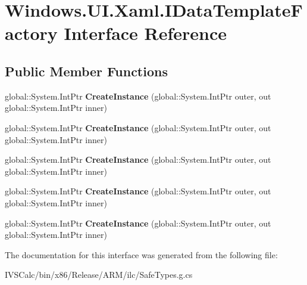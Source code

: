 \hypertarget{interface_windows_1_1_u_i_1_1_xaml_1_1_i_data_template_factory}{}\section{Windows.\+U\+I.\+Xaml.\+I\+Data\+Template\+Factory Interface Reference}
\label{interface_windows_1_1_u_i_1_1_xaml_1_1_i_data_template_factory}
\subsection*{Public Member Functions}
\begin{DoxyCompactItemize}
\item 
\mbox{\label{interface_windows_1_1_u_i_1_1_xaml_1_1_i_data_template_factory_ab292c89a22a8791585ca4182324d8a37}} 
global\+::\+System.\+Int\+Ptr {\bfseries Create\+Instance} (global\+::\+System.\+Int\+Ptr outer, out global\+::\+System.\+Int\+Ptr inner)
\item 
\mbox{\label{interface_windows_1_1_u_i_1_1_xaml_1_1_i_data_template_factory_ab292c89a22a8791585ca4182324d8a37}} 
global\+::\+System.\+Int\+Ptr {\bfseries Create\+Instance} (global\+::\+System.\+Int\+Ptr outer, out global\+::\+System.\+Int\+Ptr inner)
\item 
\mbox{\label{interface_windows_1_1_u_i_1_1_xaml_1_1_i_data_template_factory_ab292c89a22a8791585ca4182324d8a37}} 
global\+::\+System.\+Int\+Ptr {\bfseries Create\+Instance} (global\+::\+System.\+Int\+Ptr outer, out global\+::\+System.\+Int\+Ptr inner)
\item 
\mbox{\label{interface_windows_1_1_u_i_1_1_xaml_1_1_i_data_template_factory_ab292c89a22a8791585ca4182324d8a37}} 
global\+::\+System.\+Int\+Ptr {\bfseries Create\+Instance} (global\+::\+System.\+Int\+Ptr outer, out global\+::\+System.\+Int\+Ptr inner)
\item 
\mbox{\label{interface_windows_1_1_u_i_1_1_xaml_1_1_i_data_template_factory_ab292c89a22a8791585ca4182324d8a37}} 
global\+::\+System.\+Int\+Ptr {\bfseries Create\+Instance} (global\+::\+System.\+Int\+Ptr outer, out global\+::\+System.\+Int\+Ptr inner)
\end{DoxyCompactItemize}


The documentation for this interface was generated from the following file\+:\begin{DoxyCompactItemize}
\item 
I\+V\+S\+Calc/bin/x86/\+Release/\+A\+R\+M/ilc/Safe\+Types.\+g.\+cs\end{DoxyCompactItemize}
